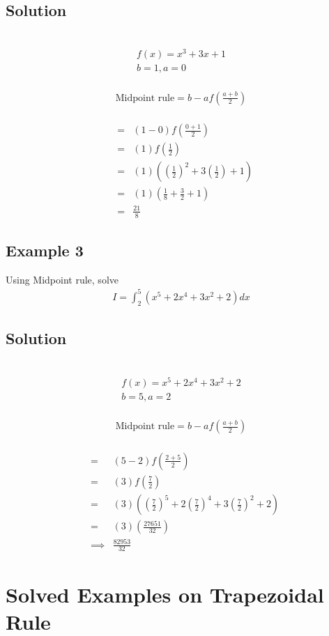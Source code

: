 \documentclass[12pt]{report}
\newcommand{\sps}{\\[0.2cm]}
\begin{document}
	\subsection*{Solution}
	{~}\\[-2.1cm]
	\begin{gather*}
		f(x) = x^3 + 3x + 1\sps
		b=1, a=0
	\end{gather*}
	{~}\\[-2.1cm]
	\begin{gather*}
		\text{Midpoint rule} = b-af\left(\frac{a+b}{2}\right)
	\end{gather*}
	{~}\\[-2.1cm]
	\begin{eqnarray*}
		&=&(1-0)f\left(\frac{0+1}{2}\right)\sps
		&=&(1)f\left(\frac{1}{2}\right)\sps
		&=&(1)\left(\left(\frac{1}{2}\right)^2 + 3\left(\frac{1}{2}\right) + 1\right)\sps
		&=&(1)\left(\frac{1}{8} + \frac{3}{2} + 1\right)\sps
		&=&\frac{21}{8}
	\end{eqnarray*}
	
	\subsection{Example 3}
	Using Midpoint rule, solve
	\begin{eqnarray*}
		I = \int_2^5\left(x^5 + 2x^4 + 3x^2 + 2\right)dx
	\end{eqnarray*}
	
	\subsection*{Solution}
	{~}\\[-2.1cm]
	\begin{gather*}
		f(x) = x^5 + 2x^4 + 3x^2 + 2\sps
		b=5, a=2
	\end{gather*}
	{~}\\[-2.1cm]
	\begin{gather*}
		\text{Midpoint rule} = b-af\left(\frac{a+b}{2}\right)
	\end{gather*}
	{~}\\[-2.1cm]
	\begin{eqnarray*}
		&=&(5-2)f\left(\frac{2+5}{2}\right)\sps
		&=&(3)f\left(\frac{7}{2}\right)\sps
		&=&(3)\left(\left(\frac{7}{2}\right)^5 + 2\left(\frac{7}{2} \right)^4+ 3\left(\frac{7}{2}\right)^2 + 2\right)\sps
		&=&(3)\left(\frac{27651}{32}\right)\sps
		&\implies& \frac{82953}{32}
	\end{eqnarray*}


	\section{Solved Examples on Trapezoidal Rule}
\end{document}
